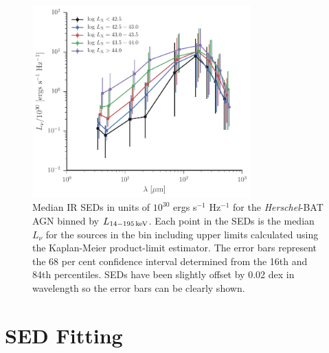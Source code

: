 \documentclass[fleqn, usenatbib]{mnras}
\newcommand{\herschel}{\emph{Herschel}}
\begin{document}
\begin{figure}
\centering
\includegraphics[width=0.75\textwidth]{figures/avg_sed_binned_lx_lnu}
\caption{Median IR SEDs in units of $10^{30}$ ergs s$^{-1}$ Hz$^{-1}$ for the \herschel-BAT AGN binned by $L_{\rm 14-195\,keV}$. Each point in the SEDs is the median $L_{\nu}$ for the sources in the bin including upper limits calculated using the Kaplan-Meier product-limit estimator. The error bars represent the 68 per cent confidence interval determined from the 16th and 84th percentiles. SEDs have been slightly offset by 0.02 dex in wavelength so the error bars can be clearly shown. \label{fig:avg_sed}}
\end{figure}

\section{SED Fitting}\label{sec:sed_fit}
\end{document}
